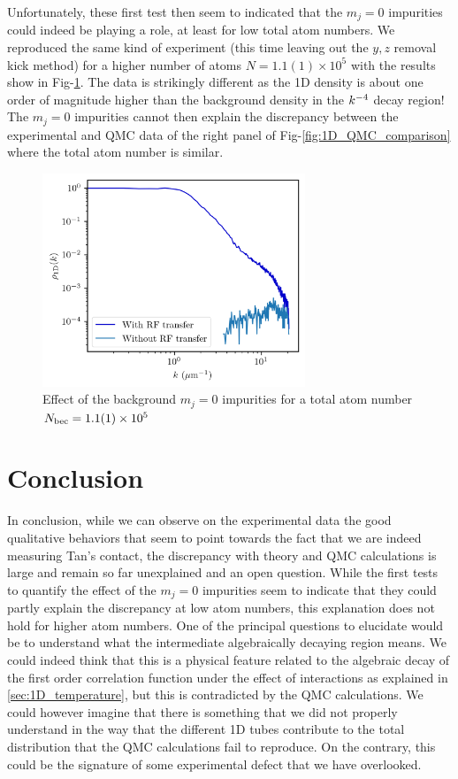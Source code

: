 Unfortunately, these first test then seem to indicated that the $m_j=0$ impurities could indeed be playing a role, at least for low total atom numbers. We reproduced the same kind of experiment (this time leaving out the $y,z$ removal kick method) for a higher number of atoms $N = 1.1(1) \times 10^5$ with the results show in Fig-\ref{fig:background_high_N}. The data is strikingly different as the 1D density is about one order of magnitude higher than the background density in the $k^{-4}$ decay region! The $m_j=0$ impurities cannot then explain the discrepancy between the experimental and QMC data of the right panel of Fig-\ref{fig:1D_QMC_comparison} where the total atom number is similar.

\begin{figure}
    \centering
    \includegraphics[width=0.7\textwidth]{Fig/Chapter5/1D_background_high.png}
    \caption{Effect of the background $m_j=0$ impurities for a total atom number $N_{\rm{bec}}=1.1(1) \times 10^5$}
    \label{fig:background_high_N}
\end{figure}

\section{Conclusion}

In conclusion, while we can observe on the experimental data the good qualitative behaviors that seem to point towards the fact that we are indeed measuring Tan's contact, the discrepancy with theory and QMC calculations is large and remain so far unexplained and an open question. While the first tests to quantify the effect of the $m_j=0$ impurities seem to indicate that they could partly explain the discrepancy at low atom numbers, this explanation does not hold for higher atom numbers. One of the principal questions to elucidate would be to understand what the intermediate algebraically decaying region means. We could indeed think that this is a physical feature related to the algebraic decay of the first order correlation function under the effect of interactions as explained in \ref{sec:1D_temperature}, but this is contradicted by the QMC calculations. We could however imagine that there is something that we did not properly understand in the way that the different 1D tubes contribute to the total distribution that the QMC calculations fail to reproduce. On the contrary, this could be the signature of some experimental defect that we have overlooked. 

